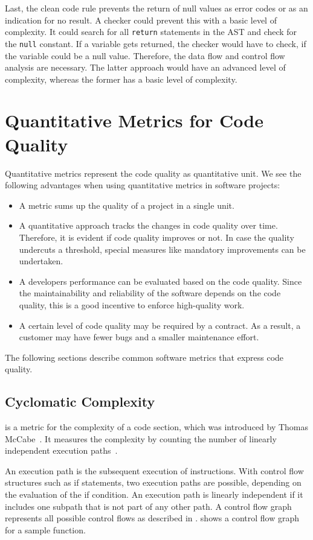 Last, the clean code rule prevents the return of null values as error codes or as an indication for no result. A checker could prevent this with a basic level of complexity. It could search for all \texttt{return} statements in the AST and check for the \texttt{null} constant. If a variable gets returned, the checker would have to check, if the variable could be a null value. Therefore, the data flow and control flow analysis are necessary. The latter approach would have an advanced level of complexity, whereas the former has a basic level of complexity. 

\section{Quantitative Metrics for Code Quality}
Quantitative metrics represent the code quality as quantitative unit. We see the following advantages when using quantitative metrics in software projects:
\begin{itemize}
    \item A metric sums up the quality of a project in a single unit.
    \item A quantitative approach tracks the changes in code quality over time. Therefore, it is evident if code quality improves or not. In case the quality undercuts a threshold, special measures like mandatory improvements can be undertaken.
    \item A developers performance can be evaluated based on the code quality. Since the maintainability and reliability of the software depends on the code quality, this is a good incentive to enforce high-quality work.
    \item A certain level of code quality may be required by a contract. As a result, a customer may have fewer bugs and a smaller maintenance effort.
\end{itemize}
The following sections describe common software metrics that express code quality.

\subsection{Cyclomatic Complexity}\label{sec:cyclomatic_complexity}
 is a metric for the complexity of a code section, which was introduced by Thomas McCabe~\cite{mccabe_complexity_1976}. It measures the complexity by counting the number of linearly independent execution paths~\cite{mccabe_complexity_1976}. 

An execution path is the subsequent execution of instructions. With control flow structures such as if statements, two execution paths are possible, depending on the evaluation of the if condition. An execution path is linearly independent if it includes one subpath that is not part of any other path. A control flow graph represents all possible control flows as described in .  shows a control flow graph for a sample function.

